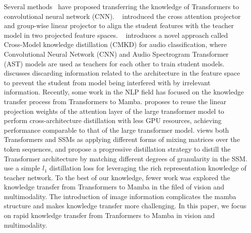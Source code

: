 Several methods~\citep{DBLP:conf/emnlp/FetahuVRM22,DBLP:journals/corr/abs-1909-03508,DBLP:journals/corr/abs-2203-06760,DBLP:conf/accv/LiuCLHDL22,wu2024aligning,hao2024one} have proposed transferring the knowledge of Transformers to convolutional neural network (CNN).
~\citep{DBLP:conf/accv/LiuCLHDL22} introduced the cross attention projector and group-wise linear projector to align the student features with the teacher model in two projected feature spaces.
~\citep{DBLP:journals/corr/abs-2203-06760} introduces a novel approach called Cross-Model knowledge distillation (CMKD) for audio classification, where Convolutional Neural Network (CNN) and Audio Spectrogram Transformer (AST) models are used as teachers for each other to train student models. 
~\citep{hao2024one} discusses discarding information related to the architecture in the feature space to prevent the student from model being interfered with by irrelevant information.
Recently, some work \citep{wang2024mamba,bick2024transformers} in the NLP field has focused on the knowledge transfer process from Transformers to Mamba.
\citep{wang2024mamba} proposes to reuse the linear projection weights of the attention layer of the large transformer model to perform cross-architecture distillation with less GPU resources, achieving performance comparable to that of the large transformer model.
\citep{bick2024transformers} views both Transformers and SSMs as applying different forms of mixing matrices over the token sequences, and propose a progressive distillation strategy to distill the Transformer architecture by matching different degrees of granularity in the SSM.
\citep{lei2024dvmsr} use a simple $l_1$ distillation loss for leveraging the rich representation knowledge of teacher network.
To the best of our knowledge, fewer work was explored the knowledge transfer from Transformers to Mamba in the filed of vision and multimodality. The introduction of image information complicates the mamba structure and makes knowledge transfer more challenging. In this paper, we focus on rapid knowledge transfer from Tranformers to Mamba in vision and multimodality.